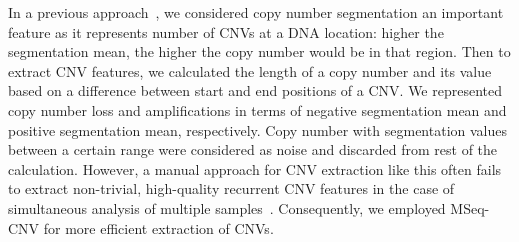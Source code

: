

\hspace*{3.5mm} In a previous approach~\cite{karim2018a2ic}, we considered copy  number segmentation an important feature as it represents number of CNVs at a DNA location: higher the segmentation mean, the higher the copy number would be in that region. Then to extract CNV features, we calculated the length of a copy number and its value based on a difference between start and end positions of a CNV. We represented copy number loss and amplifications in terms of negative segmentation mean and positive segmentation mean, respectively. Copy number with segmentation values between a certain range were considered as noise and discarded from rest of the calculation. However, a manual approach for CNV extraction like this often fails to extract non-trivial, high-quality recurrent CNV features in the case of simultaneous analysis of multiple samples~\cite{malekpour2018mseq}. Consequently, we employed MSeq-CNV for more efficient extraction of CNVs. 

